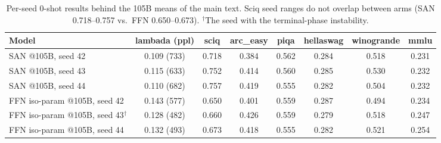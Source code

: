 \begin{table}[t]\centering\footnotesize
\begin{tabular}{lccccccc}
\toprule
Model & lambada (ppl) & sciq & arc\_easy & piqa & hellaswag & winogrande & mmlu \\
\midrule
SAN @105B, seed 42 & 0.109 (733) & 0.718 & 0.384 & 0.562 & 0.284 & 0.518 & 0.231 \\
SAN @105B, seed 43 & 0.115 (633) & 0.752 & 0.414 & 0.560 & 0.285 & 0.530 & 0.232 \\
SAN @105B, seed 44 & 0.110 (682) & 0.757 & 0.419 & 0.555 & 0.282 & 0.504 & 0.232 \\
\midrule
FFN iso-param @105B, seed 42 & 0.143 (577) & 0.650 & 0.401 & 0.559 & 0.287 & 0.494 & 0.234 \\
FFN iso-param @105B, seed 43$^\dagger$ & 0.128 (482) & 0.660 & 0.426 & 0.559 & 0.279 & 0.518 & 0.247 \\
FFN iso-param @105B, seed 44 & 0.132 (493) & 0.673 & 0.418 & 0.555 & 0.282 & 0.521 & 0.254 \\
\bottomrule
\end{tabular}
\caption{Per-seed 0-shot results behind the 105B means of the main text.
Sciq seed ranges do not overlap between arms (SAN 0.718--0.757 vs.\ FFN
0.650--0.673). $^\dagger$The seed with the terminal-phase instability.}
\label{tab:downstream_seeds}
\end{table}
